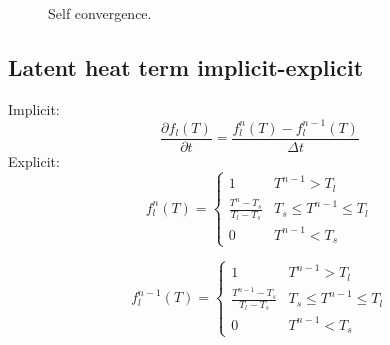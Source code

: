 \documentclass[a4paper,12pt]{article}
\begin{document}
\begin{figure}[!ht]
     \hfill
     \caption{Self convergence. }
     \label{fig:nolat_convergence}
   \end{figure}


\subsection{Latent heat term implicit-explicit}
Implicit: 
\begin{equation}
\frac{\partial   f_l(T)}{\partial t} = \frac{f_l^{n}(T)-f_l^{n-1}(T)}{\Delta t} 
\end{equation}
Explicit: 
\begin{equation}
f_l^{n}(T) =
\left\{
\begin{array}{cc}
1 & T^{n-1}>T_l \\
\frac{T^n-T_s}{T_l - T_s} & T_s \leq T^{n-1} \leq T_l \\
0 & T^{n-1} < T_s
\end{array}
\right.
\end{equation}

\begin{equation}
f_l^{n-1}(T) =
\left\{
\begin{array}{cc}
1 & T^{n-1}>T_l \\
\frac{T^{n-1}-T_s}{T_l - T_s} & T_s \leq T^{n-1} \leq T_l \\
0 & T^{n-1} < T_s
\end{array}
\right.
\end{equation}
\end{document}
